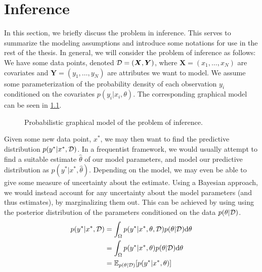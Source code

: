 \chapter{Inference}

In this section, we briefly discuss the problem in inference.
This serves to summarize the modeling assumptions and introduce some notations for use in the rest of the thesis. 
In general, we will consider the problem of inference as follows:
We have some data points, denoted $\mathcal{D} = (\bm{X}, \bm{Y})$, where $\bm{X} = (x_1,\dots,x_N)$ are covariates and $\bm{Y} = (y_1, \dots, y_N)$ are attributes we want to model. 
We assume some parameterization of the probability density of each observation $y_i$ conditioned on the covariates $p(y_i|x_i,\theta)$.
The corresponding graphical model can be seen in \cref{fig:pgm}. 
\begin{figure}[htbp]
    \centering
    \caption{Probabilistic graphical model of the problem of inference.}
    \label{fig:pgm}
\end{figure}
Given some new data point, $x^\ast$, we may then want to find the predictive distribution $p(y^\ast | x^\ast, \mathcal{D})$. 
In a frequentist framework, we would usually attempt to find a suitable estimate $\hat{\theta}$ of our model parameters, and model our predictive distribution as $p(y^\ast | x^\ast, \hat{\theta})$.
Depending on the model, we may even be able to give some measure of uncertainty about the estimate.
Using a Bayesian approach, we would instead account for any uncertainty about the model parameters (and thus estimates), by marginalizing them out. 
This can be achieved by using using the posterior distribution of the parameters conditioned on the data $p(\theta|\mathcal{D})$.
\begin{equation}\label{eq:inference}
    \begin{aligned}
        p(y^\ast | x^\ast, \mathcal{D}) &= \int_{\Omega} p(y^\ast | x^\ast, \theta, \mathcal{D})  p(\theta|\mathcal{D}) \dd\theta \\
        &= \int_{\Omega} p(y^\ast | x^\ast, \theta)  p(\theta|\mathcal{D}) \dd\theta\\
        &= \operatorname{\mathbb{E}}_{p(\theta|\mathcal{D})} [p(y^\ast | x^\ast, \theta)] 
    \end{aligned}
\end{equation}
